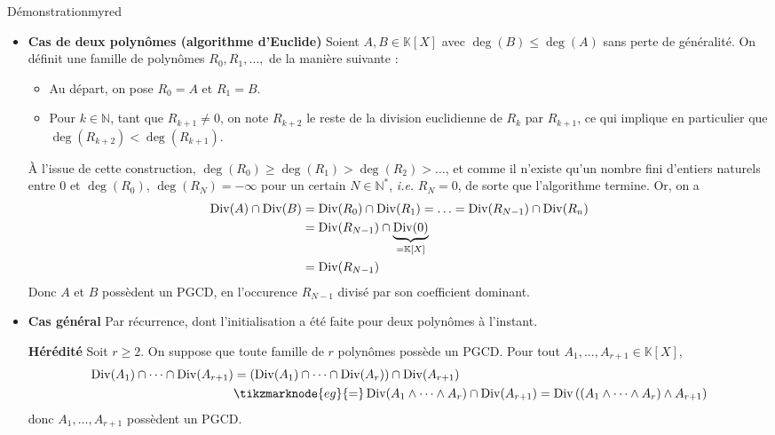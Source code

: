     \begin{demo}{Démonstration}{myred}
        \begin{itemize}
            \item \textbf{Cas de deux polynômes (algorithme d’Euclide)} \quad Soient $A,B \in \mathbb{K}[X]$ avec $\deg(B) \leq \deg(A)$ sans perte de généralité. On définit une famille de polynômes $R_0, R_1,\ldots,$ de la manière suivante :
            \begin{itemize}
                \item Au départ, on pose $R_0 = A$ et $R_1 = B$.
                \item Pour $k \in \mathbb{N}$, tant que $R_{k+1} \neq 0$, on note $R_{k+2}$ le reste de la division euclidienne de $R_k$ par $R_{k+1}$, ce qui implique en particulier que $\deg(R_{k+2}) < \deg(R_{k+1})$.
            \end{itemize}
            À l’issue de cette construction, $\deg(R_0) \geq \deg(R_1) > \deg(R_2) > \ldots$, et comme il n’existe qu’un nombre fini d’entiers naturels entre $0$ et $\deg(R_0)$, $\deg(R_N) = - \infty$ pour un certain $N \in \mathbb{N}^*$, \textit{i.e.} $R_N = 0$, de sorte que l’algorithme termine. Or, on a 
            \begin{align*}
                \operatorname{Div}(A) \cap \operatorname{Div}(B) 
                &= \operatorname{Div}(R_0) \cap \operatorname{Div}(R_1) = \ldots = \operatorname{Div}(R_{N-1}) \cap \operatorname{Div}(R_n) \\
                &= \operatorname{Div}(R_{N-1}) \cap \underbrace{\operatorname{Div}(0)}_{= \mathbb{K}[X]} \\
                &= \operatorname{Div}(R_{N-1})
            \end{align*}
            Donc $A$ et $B$ possèdent un PGCD, en l’occurence $R_{N-1}$ divisé par son coefficient dominant.
            \item \textbf{Cas général} \quad Par récurrence, dont l’initialisation a été faite pour deux polynômes à l’instant.
            
            \textbf{Hérédité} \quad Soit $r \geq 2$. On suppose que toute famille de $r$ polynômes possède un PGCD. Pour tout $A_1,\ldots,A_{r+1} \in \mathbb{K}[X]$, 
            \begin{align*}
                \Div(A_1) \cap \cdots \cap \Div(A_{r+1}) 
                &= \left(\Div(A_1) \cap \cdots \cap \Div(A_r)\right) \cap \Div(A_{r+1}) \\
                &\tikzmarknode{eg}{=} \Div(A_1 \wedge \cdots \wedge A_r) \cap \Div(A_{r+1}) = \Div\left((A_1 \wedge \cdots \wedge A_r) \wedge A_{r+1}\right)
            \end{align*}
             \hfill donc $A_1, \ldots, A_{r+1}$ possèdent un PGCD.
        \end{itemize}
    \end{demo}

